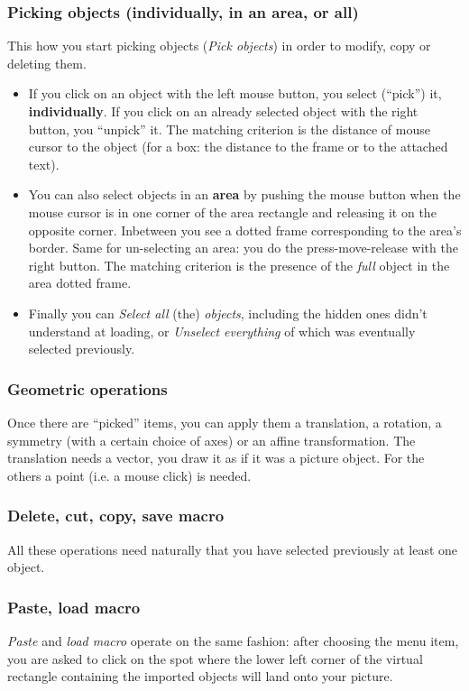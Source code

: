 \documentclass[11pt,a4paper]{article}
\begin{document}
\subsubsection{Picking objects (individually, in an area, or all)}
%
This how you start picking objects ({\sl Pick objects}) in order
to modify, copy or deleting them.
\begin{itemize}
\item
If you click on an object with
the left mouse button, you select (``pick'') it, {\bf individually}.
If you click on an already selected object
with the right button, you ``unpick'' it.
The matching criterion is the distance of mouse cursor to the object
(for a box: the distance to the frame or to the attached text).
%
\item
You can also select objects in an {\bf area} by pushing
the mouse button when the mouse cursor is in one corner of the area rectangle
and releasing it on the opposite corner. Inbetween you see a
dotted frame corresponding to the area's border.
Same for un-selecting an area: you do the press-move-release with the right button.
The matching criterion is the presence of the {\em full} object in the
area dotted frame.
%
\item
Finally you can {\sl Select all } (the)
{\sl objects}, including the hidden ones {\TC} didn't understand at loading,
or {\sl Unselect everything} of which was eventually selected previously.
\end{itemize}
%
\subsubsection{Geometric operations}
Once there are ``picked'' items, you can apply them
a translation, a rotation, a symmetry (with a certain choice
of axes) or an affine transformation. The translation needs
a vector, you draw it as if it was a picture object.
For the others a point (i.e. a mouse click) is needed.
%
\subsubsection{Delete, cut, copy, save macro}
%
All these operations need naturally that you have
selected previously at least one object.
%
\subsubsection{Paste, load macro}
%
{\sl Paste} and {\sl load macro} operate on the same
fashion: after choosing the menu item, you are asked to click on
the spot where the lower left corner of the virtual rectangle
containing the imported objects will land onto your picture.
%
\end{document}
